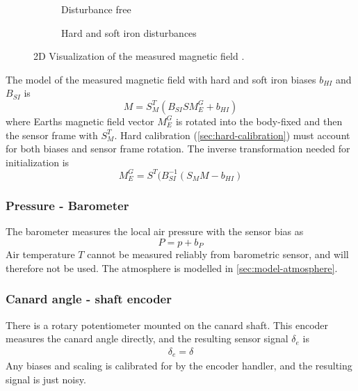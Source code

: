 \begin{figure}[ht!]
    \centering
    \begin{subfigure}{0.4\textwidth}
        \resizebox{0.7\textwidth}{!}{
        }
        \caption{Disturbance free}
        \label{fig:meas-mag-free}
    \end{subfigure}
    \begin{subfigure}{0.4\textwidth}
        \resizebox{0.7\textwidth}{!}{
        }
        \caption{Hard and soft iron disturbances}
        \label{fig:meas-mag-dist}
    \end{subfigure}
    \caption[2D Visualization of the measured magnetic field.]{2D Visualization of the measured magnetic field \cite{vectornav2024}.}
    \label{fig:meas-mag}
\end{figure}

The model of the measured magnetic field with hard and soft iron biases $b_{HI}$ and $B_{SI}$ is 
\begin{equation}
    M = S_M^T ( B_{SI} S M_E^G + b_{HI} ) \label{eq:meas-mag}
\end{equation}
where Earths magnetic field vector $M_E^G$ is rotated into the body-fixed and then the sensor frame with $S_M^T$.
Hard calibration (\autoref{sec:hard-calibration}) must account for both biases and sensor frame rotation.
The inverse transformation needed for initialization is 
\begin{equation}
    M_E^G = S^T ( B_{SI}^{-1} (S_M M - b_{HI} ) \label{eq:meas-mag-init}
\end{equation}

\subsubsection{Pressure - Barometer}
The barometer measures the local air pressure with the sensor bias as
\begin{equation}
    P = p + b_P
\end{equation}
Air temperature $T$ cannot be measured reliably from barometric sensor, and will therefore not be used.
The atmosphere is modelled in \autoref{sec:model-atmosphere}.

\subsubsection{Canard angle - shaft encoder}
There is a rotary potentiometer mounted on the canard shaft.
This encoder measures the canard angle directly, and the resulting sensor signal $\delta_e$ is 
\begin{align}
    \delta_e = \delta
\end{align}
Any biases and scaling is calibrated for by the encoder handler, and the resulting signal is just noisy. 

